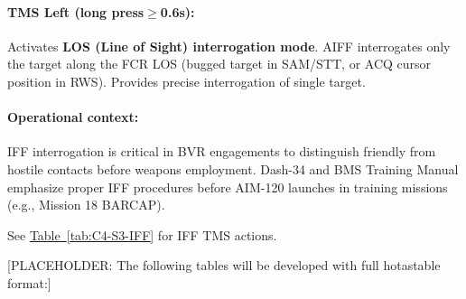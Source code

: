 \documentclass[11pt, a4paper, twoside]{report}
\newenvironment{hotastable}[1]{%
	\footnotesize
	\setlength{\tabcolsep}{3pt}
	\renewcommand{\arraystretch}{1.35}
	\begin{longtable}{L{1.00cm} L{0.90cm} L{0.90cm} L{3.30cm} L{6.40cm} L{1.40cm} L{1.60cm}}
		\caption{#1}\label{table.\thetable}\\
		\addtocontents{hotas}{\protect\contentsline{table}{\protect\numberline{\thetable}#1}{\thepage}{table.\thetable}}%
		\rowcolor{headerblue}
		\multicolumn{1}{>{\centering\arraybackslash}p{1.00cm}}{\textbf{\color{white}Mode}} &
		\multicolumn{1}{>{\centering\arraybackslash}p{0.90cm}}{\textbf{\color{white}Dir.}} &
		\multicolumn{1}{>{\centering\arraybackslash}p{0.90cm}}{\textbf{\color{white}Act.}} &
		\multicolumn{1}{>{\centering\arraybackslash}p{3.30cm}}{\textbf{\color{white}Function}} &
		\multicolumn{1}{>{\centering\arraybackslash}p{6.40cm}}{\textbf{\color{white}Effect / Nuance}} &
		\multicolumn{1}{>{\centering\arraybackslash}p{1.40cm}}{\textbf{\color{white}Dash34}} &
		\multicolumn{1}{>{\centering\arraybackslash}p{1.60cm}}{\textbf{\color{white}Train.}} \\
		\endfirsthead
		\rowcolor{headerblue}
		\multicolumn{1}{>{\centering\arraybackslash}p{1.00cm}}{\textbf{\color{white}Mode}} &
		\multicolumn{1}{>{\centering\arraybackslash}p{0.90cm}}{\textbf{\color{white}Dir.}} &
		\multicolumn{1}{>{\centering\arraybackslash}p{0.90cm}}{\textbf{\color{white}Act.}} &
		\multicolumn{1}{>{\centering\arraybackslash}p{3.30cm}}{\textbf{\color{white}Function}} &
		\multicolumn{1}{>{\centering\arraybackslash}p{6.40cm}}{\textbf{\color{white}Effect / Nuance}} &
		\multicolumn{1}{>{\centering\arraybackslash}p{1.40cm}}{\textbf{\color{white}Dash34}} &
		\multicolumn{1}{>{\centering\arraybackslash}p{1.60cm}}{\textbf{\color{white}Train.}} \\
		\endhead
		\multicolumn{7}{r}{\small\emph{Continued on next page}}\\
		\endfoot
		\endlastfoot
	}{%
	\end{longtable}
}
\newcommand{\tabref}[1]{\hyperref[#1]{Table~\ref*{#1}}}
\begin{document}
\paragraph{TMS Left (long press$\geq$0.6s):}
Activates \textbf{LOS (Line of Sight) interrogation mode}. AIFF interrogates only the target along the FCR LOS (bugged target in SAM/STT, or ACQ cursor position in RWS). Provides precise interrogation of single target.

\paragraph{Operational context:}
IFF interrogation is critical in BVR engagements to distinguish friendly from hostile contacts before weapons employment. Dash-34 and BMS Training Manual emphasize proper IFF procedures before AIM-120 launches in training missions (e.g., Mission 18 BARCAP).

See \tabref{tab:C4-S3-IFF} for IFF TMS actions.


[PLACEHOLDER: The following tables will be developed with full hotastable format:]


\end{document}
